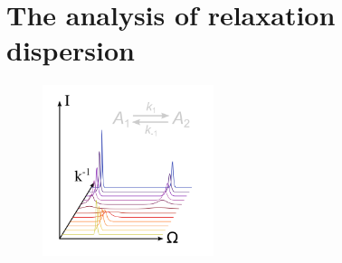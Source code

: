


\chapter[Relaxation dispersion]{The analysis of relaxation dispersion} \label{ch: relax-disp}

\begin{figure}[h]
  \includegraphics[width=5cm, bb=0 0 1701 1701]{graphics/analyses/relax_disp_600x600}
\end{figure}


